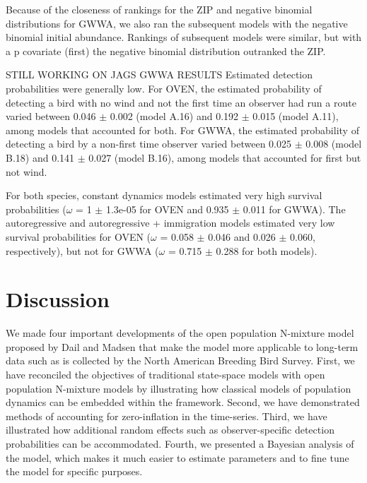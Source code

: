\documentclass[12pt]{article}
\begin{document}
Because of the closeness of rankings for the ZIP and negative binomial
distributions for GWWA, we also ran the subsequent models with the
negative binomial initial abundance.  Rankings of subsequent models
were similar, but with a p covariate (first) the negative binomial
distribution outranked the ZIP.

STILL WORKING ON JAGS GWWA RESULTS
Estimated detection probabilities were generally low.  For OVEN, the
estimated probability of detecting a bird with no wind and not the
first time an observer had run a route varied between 0.046 $\pm$ 0.002
(model A.16) and 0.192 $\pm$ 0.015 (model A.11), among models that
accounted for both.  For GWWA, the estimated probability of detecting
a bird by a non-first time observer varied between 0.025 $\pm$ 0.008
(model B.18) and 0.141 $\pm$ 0.027 (model B.16), among models that
accounted for first but not wind.

For both species, constant dynamics models estimated very high
survival probabilities ($\omega$ = 1 $\pm$ 1.3e-05 for OVEN and 0.935 $\pm$ 0.011 for
GWWA).   The autoregressive and autoregressive + immigration models
estimated very low survival probabilities for OVEN ($\omega$ = 0.058 $\pm$ 0.046
and 0.026 $\pm$ 0.060, respectively), but not for GWWA ($\omega$ = 0.715 $\pm$ 0.288
for both models).




\section{Discussion}



	We made four important developments of the open population
        N-mixture model proposed by Dail and Madsen that make the
        model more applicable to long-term data such as is collected
        by the North American Breeding Bird Survey. First, we have
        reconciled the objectives of traditional state-space models
        with open population N-mixture models by illustrating how
        classical models of population dynamics can be embedded within
        the framework. Second, we have demonstrated methods of
        accounting for zero-inflation in the time-series. Third, we
        have illustrated how additional random effects such as
        observer-specific detection probabilities can be
        accommodated. Fourth, we presented a Bayesian analysis of the
        model, which makes it much easier to estimate parameters and
        to fine tune the model for specific purposes.
\end{document}
